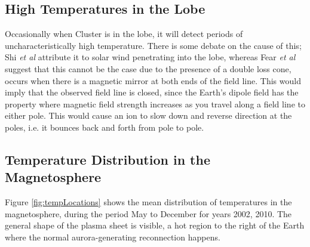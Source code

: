 \documentclass[12pt]{article}
\begin{document}
\subsection{High Temperatures in the Lobe}
Occasionally when Cluster is in the lobe, it will detect periods of uncharacteristically high temperature. There is some debate on the cause of this; Shi \textit{et al} \cite{Shi2013} attribute it to solar wind penetrating into the lobe, whereas Fear \textit{et al} \cite{Fear1506} suggest that this cannot be the case due to the presence of a double loss cone, occurs when there is a magnetic mirror at both ends of the field line. This would imply that the observed field line is closed, since the Earth's dipole field has the property where magnetic field strength increases as you travel along a field line to either pole. This would cause an ion to slow down and reverse direction at the poles, i.e. it bounces back and forth from pole to pole.



\subsection{Temperature Distribution in the Magnetosphere}
Figure \ref{fig:tempLocations} shows the mean distribution of temperatures in the magnetosphere, during the period May to December for years 2002, 2010. The general shape of the plasma sheet is visible, a hot region to the right of the Earth where the normal aurora-generating reconnection happens.
\end{document}
